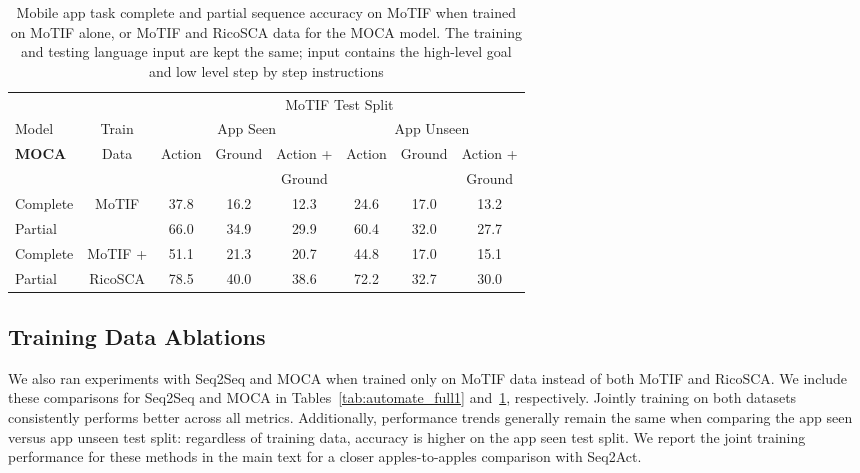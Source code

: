 \begin{table}[t]
    \centering
          \renewcommand\arraystretch{0.95}

        \caption{Mobile app task complete and partial sequence accuracy on MoTIF when trained on MoTIF alone, or MoTIF and RicoSCA data for the MOCA model. The training and testing language input are kept the same; input contains the high-level goal and low level step by step instructions }
    \begin{tabular}{|l|c|c|c|c|c|c|c|}
    \hline
    & & \multicolumn{6}{c|}{MoTIF Test Split}\\
    \cline{3-8}
      Model & Train & \multicolumn{3}{c|}{App Seen} & \multicolumn{3}{c|}{App Unseen}\\
    \cline{3-8}
   \textbf{MOCA} & Data & \multirow{2}{*}{Action} & \multirow{2}{*}{Ground} & Action + &  \multirow{2}{*}{Action} & \multirow{2}{*}{Ground} & Action +\\
   & & & & Ground& & & Ground\\
    \hline
    Complete & \multirow{2}{*}{MoTIF} & 37.8 & 16.2 & 12.3 & 24.6 & 17.0 & 13.2 \\
    Partial & & 66.0 & 34.9 & 29.9 & 60.4 & 32.0 & 27.7 \\
    \hline
    Complete & MoTIF +  & 51.1 & 21.3 & 20.7 & 44.8 & 17.0 & 15.1 \\
    Partial & RicoSCA & 78.5 & 40.0 & 38.6 & 72.2 & 32.7 & 30.0 \\
    \hline
    \end{tabular}
    \label{tab:automate_full2}
\end{table}
\subsection{Training Data Ablations}
\label{sec:auto_data}

We also ran experiments with Seq2Seq and MOCA when trained only on MoTIF data instead of both MoTIF and RicoSCA. We include these comparisons for Seq2Seq and MOCA in Tables~\ref{tab:automate_full1} and~\ref{tab:automate_full2}, respectively. Jointly training on both datasets consistently performs better across all metrics. Additionally, performance trends generally remain the same when comparing the app seen versus app unseen test split: regardless of training data, accuracy is higher on the app seen test split.
We report the joint training performance for these methods in the main text for a closer apples-to-apples comparison with Seq2Act.

